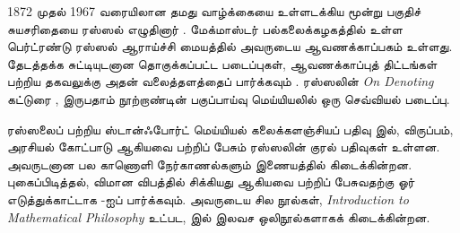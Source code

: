 \documentclass[../../../include/open-logic-section]{subfiles}
\begin{document}
\begin{reading}
1872 முதல் 1967 வரையிலான தமது வாழ்க்கையை உள்ளடக்கிய மூன்று பகுதிச்
சுயசரிதையை ரஸ்ஸல் எழுதினார் \citep{Russell1967,Russell1968,Russell1969}.
மேக்மாஸ்டர் பல்கலைக்கழகத்தில் உள்ள பெர்ட்ரண்டு ரஸ்ஸல் ஆராய்ச்சி
மையத்தில் அவருடைய ஆவணக்காப்பகம் உள்ளது. தேடத்தக்க சுட்டியுடனான
தொகுக்கப்பட்ட படைப்புகள், ஆவணக்காப்புத் திட்டங்கள் பற்றிய தகவலுக்கு
அதன் வலைத்தளத்தைப் பார்க்கவும் \citet{Duncan2015}. ரஸ்ஸலின்
\emph{On Denoting} கட்டுரை \citep{Russell1905}, இருபதாம் நூற்றாண்டின்
பகுப்பாய்வு மெய்யியலில் ஒரு செவ்வியல் படைப்பு.

ரஸ்ஸலைப் பற்றிய ஸ்டான்ஃபோர்ட் மெய்யியல் கலைக்களஞ்சியப் பதிவு
\citep{Irvine2015} இல், விருப்பம், அரசியல் கோட்பாடு ஆகியவை பற்றிப்
பேசும் ரஸ்ஸலின் குரல் பதிவுகள் உள்ளன. அவருடனான பல காணொளி
நேர்காணல்களும் இணையத்தில் கிடைக்கின்றன. புகைப்பிடித்தல், விமான
விபத்தில் சிக்கியது ஆகியவை பற்றிப் பேசுவதற்கு ஓர் எடுத்துக்காட்டாக
\citet{RussellND}-ஐப் பார்க்கவும். அவருடைய சில நூல்கள்,
\emph{Introduction to Mathematical Philosophy} உட்பட,
\citet{LibriVoxND} இல் இலவச ஒலிநூல்களாகக் கிடைக்கின்றன.
\end{reading}
\end{document}
